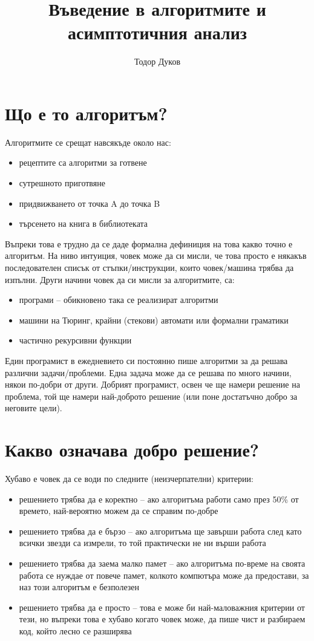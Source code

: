 \documentclass{article}
\title{Въведение в алгоритмите и асимптотичния анализ}
\author{Тодор Дуков}
\date{}
\theoremstyle{definition}
\theoremstyle{plain}
\theoremstyle{remark}
\theoremstyle{definition}
\begin{document}
\maketitle

\section*{Що е то алгоритъм?}

Алгоритмите се срещат навсякъде около нас:
\begin{itemize}
  \item рецептите са алгоритми за готвене
  \item сутрешното приготвяне
  \item придвижването от точка A до точка B
  \item търсенето на книга в библиотеката
\end{itemize}

Въпреки това е трудно да се даде формална дефиниция на това какво точно е алгоритъм.
На ниво интуиция, човек може да си мисли, че това просто е някакъв последователен списък от стъпки/инструкции, които човек/машина трябва да изпълни.
Други начини човек да си мисли за алгоритмите, са:
\begin{itemize}
  \item програми -- обикновено така се реализират алгоритми
  \item машини на Тюринг, крайни (стекови) автомати или формални граматики
  \item частично рекурсивни функции
\end{itemize}

Един програмист в ежедневието си постоянно пише алгоритми за да решава различни задачи/проблеми.
Една задача може да се решава по много начини, някои по-добри от други.
Добрият програмист, освен че ще намери решение на проблема, той ще намери най-доброто решение (или поне достатъчно добро за неговите цели).

\section*{Какво означава добро решение?}

Хубаво е човек да се води по следните (неизчерпателни) критерии:
\begin{itemize}
  \item решението трябва да е коректно -- ако алгоритъма работи само през 50\% от времето, най-вероятно можем да се справим по-добре
  \item решението трябва да е бързо -- ако алгоритъма ще завърши работа след като всички звезди са измрели, то той практически не ни върши работа
  \item решението трябва да заема малко памет -- ако алгоритъма по-време на своята работа се нуждае от повече памет, колкото компютъра може да предостави, за наз този алгоритъм е безполезен
  \item решението трябва да е просто -- това е може би най-маловажния критерии от тези, но въпреки това е хубаво когато човек може, да пише чист и разбираем код, който лесно се разширява
\end{itemize}
\end{document}
